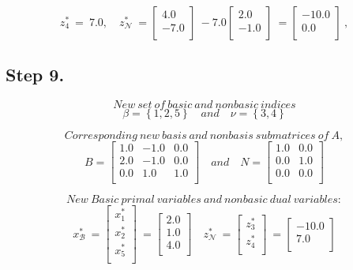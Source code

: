 \[
z_{4}^{*}\ =\ 7.0, \quad z_{\mathcal N}^{*}\ =\begin{bmatrix}
4.0 \\ -7.0 \\ 
\end{bmatrix}\ -7.0\begin{bmatrix}
2.0 \\ -1.0 \\ 
\end{bmatrix}\ =\begin{bmatrix}
-10.0 \\ 0.0 \\ 
\end{bmatrix}\ ,
\]
\subsection{Step 9.}

\[ New\ set\  of\  basic\  and\  nonbasic\  indices \]
\[
\beta= \left\{1, 2, 5\right\} \quad and \quad  \nu=\left\{3, 4\right\}
\]

\[
Corresponding\ new\ basis\ and\ nonbasis\ submatrices\ of\ A,
\]
\[
B =
\begin{bmatrix}
1.0 & -1.0 & 0.0 \\ 2.0 & -1.0 & 0.0 \\ 0.0 & 1.0 & 1.0 \\ 
\end{bmatrix} \quad and \quad
\mathit{N} =
\begin{bmatrix}
1.0 & 0.0 \\ 0.0 & 1.0 \\ 0.0 & 0.0 \\ 
\end{bmatrix}
\]

\[
New\ Basic\ primal\ variables\ and\ nonbasic\ dual\ variables:
\]
\[
x_{\mathcal B}^{*}\ =\begin{bmatrix}
x_{1}^{*} \\x_{2}^{*} \\x_{5}^{*} \\
\end{bmatrix}\ =\begin{bmatrix}
2.0 \\ 1.0 \\ 4.0 \\ 
\end{bmatrix}\quad
z_{\mathcal N}^{*}\ =\begin{bmatrix}
z_{3}^{*} \\z_{4}^{*} \\
\end{bmatrix}\ =\begin{bmatrix}
-10.0 \\ 7.0 \\ 
\end{bmatrix}
\]
